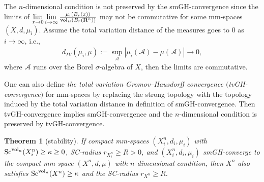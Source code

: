 \documentclass[10pt,a4paper]{amsart}
\newtheorem{Theorem}{Theorem}[section]
\begin{document}
\begin{Remark}
The $n$-dimensional condition is not preserved by the smGH-convergence since the limits of $\lim\limits_{r \to 0}\lim\limits_{i \to \infty}\frac{\mu_i(B_r(x))}{{\rm vol}_E(B_r(\mathbf{R}^n))}$ may not be commutative for some mm-spaces $(X, d, \mu_i)$. Assume the total variation distance of the measures goes to 0 as $i \to \infty$, i.e.,
\begin{gather*}
d_{TV}(\mu_i, \mu):=\sup\limits_{\mathcal{A}}|\mu_i(\mathcal{A})-\mu(\mathcal{A})|\to 0,
\end{gather*}
where $\mathcal{A}$ runs over the Borel $\sigma$-algebra of $X$, then the limits are commutative.
\end{Remark}

One can also define \textit{the total variation Gromov--Hausdorff convergence $($tvGH-convergence$)$} for mm-spaces by replacing the strong topology with the topology induced by the total variation distance in definition of smGH-convergence. Then tvGH-convergence implies smGH-convergence and the $n$-dimensional condition is preserved by tvGH-convergence.

\begin{Theorem}[stability]
If compact mm-spaces $(X_i^n, d_i, \mu_i)$ with ${\rm Sc}^{{\rm vol}_n}(X^n_i)\geq \kappa\geq 0$, SC-radius $r_{X^n_i}\geq R>0$, and $(X_i^n, d_i, \mu_i)$ smGH-converge to the compact mm-space $(X^n, d, \mu)$ with $n$-dimensional condition, then $X^n$ also satisfies ${\rm Sc}^{{\rm vol}_n}(X^n)\geq \kappa$ and the SC-radius $r_{X^n}\geq R$.
\end{Theorem}
\end{document}
